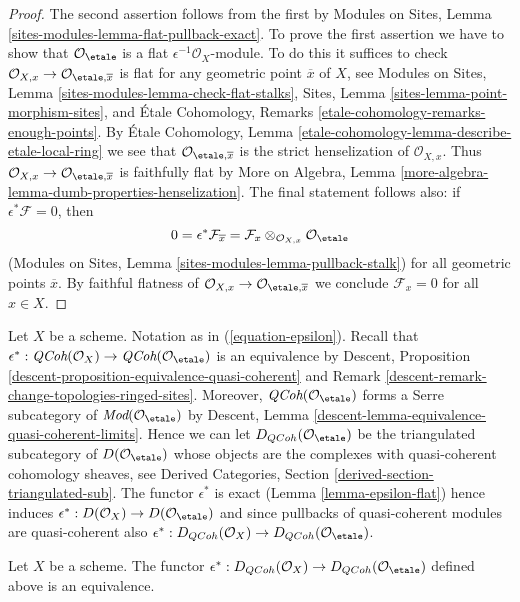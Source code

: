 \begin{proof}
The second assertion follows from the first by
Modules on Sites, Lemma \ref{sites-modules-lemma-flat-pullback-exact}.
To prove the first assertion we have to show that
$\mathcal{O}_\etale$ is a flat $\epsilon^{-1}\mathcal{O}_X$-module.
To do this it suffices to check
$\mathcal{O}_{X, x} \to \mathcal{O}_{\etale, \overline{x}}$
is flat for any geometric point $\overline{x}$ of $X$, see
Modules on Sites, Lemma
\ref{sites-modules-lemma-check-flat-stalks},
Sites, Lemma
\ref{sites-lemma-point-morphism-sites},
and
\'Etale Cohomology, Remarks
\ref{etale-cohomology-remarks-enough-points}.
By \'Etale Cohomology, Lemma
\ref{etale-cohomology-lemma-describe-etale-local-ring}
we see that $\mathcal{O}_{\etale, \overline{x}}$ is the
strict henselization of $\mathcal{O}_{X, x}$. Thus
$\mathcal{O}_{X, x} \to \mathcal{O}_{\etale, \overline{x}}$
is faithfully flat by More on Algebra,
Lemma \ref{more-algebra-lemma-dumb-properties-henselization}.
The final statement follows also: if $\epsilon^*\mathcal{F} = 0$, then
$$
0 = \epsilon^*\mathcal{F}_{\overline{x}} =
\mathcal{F}_x \otimes_{\mathcal{O}_{X, x}} \mathcal{O}_\etale
$$
(Modules on Sites, Lemma \ref{sites-modules-lemma-pullback-stalk})
for all geometric points $\overline{x}$. By faithful flatness of
$\mathcal{O}_{X, x} \to \mathcal{O}_{\etale, \overline{x}}$
we conclude $\mathcal{F}_x = 0$ for all $x \in X$.
\end{proof}

\noindent
Let $X$ be a scheme. Notation as in (\ref{equation-epsilon}).
Recall that $\epsilon^* : \textit{QCoh}(\mathcal{O}_X)
\to \textit{QCoh}(\mathcal{O}_\etale)$
is an equivalence by
Descent, Proposition \ref{descent-proposition-equivalence-quasi-coherent} and
Remark \ref{descent-remark-change-topologies-ringed-sites}.
Moreover, $\textit{QCoh}(\mathcal{O}_\etale)$ forms a
Serre subcategory of
$\textit{Mod}(\mathcal{O}_\etale)$ by
Descent, Lemma \ref{descent-lemma-equivalence-quasi-coherent-limits}.
Hence we can let $D_{QCoh}(\mathcal{O}_\etale)$ be the triangulated
subcategory of $D(\mathcal{O}_\etale)$ whose objects are the
complexes with quasi-coherent cohomology sheaves, see
Derived Categories, Section \ref{derived-section-triangulated-sub}.
The functor $\epsilon^*$ is exact (Lemma \ref{lemma-epsilon-flat})
hence induces
$\epsilon^* :  D(\mathcal{O}_X) \to D(\mathcal{O}_\etale)$
and since pullbacks of quasi-coherent modules are quasi-coherent
also $\epsilon^* : D_{QCoh}(\mathcal{O}_X) \to
D_{QCoh}(\mathcal{O}_\etale)$.

\begin{lemma}
\label{lemma-derived-quasi-coherent-small-etale-site}
Let $X$ be a scheme. The functor
$\epsilon^* : D_{QCoh}(\mathcal{O}_X) \to
D_{QCoh}(\mathcal{O}_\etale)$
defined above is an equivalence.
\end{lemma}

